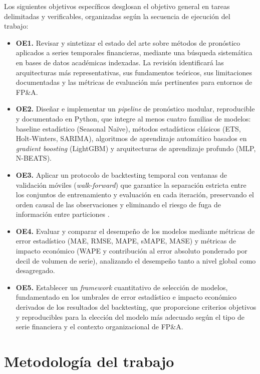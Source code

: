 Los siguientes objetivos específicos desglosan el objetivo general en tareas delimitadas y verificables, organizadas según la secuencia de ejecución del trabajo:

\begin{itemize}
  \item \textbf{OE1.} Revisar y sintetizar el estado del arte sobre métodos de pronóstico aplicados a series temporales financieras, mediante una búsqueda sistemática en bases de datos académicas indexadas. La revisión identificará las arquitecturas más representativas, sus fundamentos teóricos, sus limitaciones documentadas y las métricas de evaluación más pertinentes para entornos de FP\&A.

  \item \textbf{OE2.} Diseñar e implementar un \textit{pipeline} de pronóstico modular, reproducible y documentado en Python, que integre al menos cuatro familias de modelos: baseline estadístico (Seasonal Naïve), métodos estadísticos clásicos (ETS, Holt-Winters, SARIMA), algoritmos de aprendizaje automático basados en \textit{gradient boosting} (LightGBM) y arquitecturas de aprendizaje profundo (MLP, N-BEATS).

  \item \textbf{OE3.} Aplicar un protocolo de backtesting temporal con ventanas de validación móviles (\textit{walk-forward}) que garantice la separación estricta entre los conjuntos de entrenamiento y evaluación en cada iteración, preservando el orden causal de las observaciones y eliminando el riesgo de fuga de información entre particiones \parencite{Bergmeir2012}.

  \item \textbf{OE4.} Evaluar y comparar el desempeño de los modelos mediante métricas de error estadístico (MAE, RMSE, MAPE, sMAPE, MASE) y métricas de impacto económico (WAPE y contribución al error absoluto ponderado por decil de volumen de serie), analizando el desempeño tanto a nivel global como desagregado.

  \item \textbf{OE5.} Establecer un \textit{framework} cuantitativo de selección de modelos, fundamentado en los umbrales de error estadístico e impacto económico derivados de los resultados del backtesting, que proporcione criterios objetivos y reproducibles para la elección del modelo más adecuado según el tipo de serie financiera y el contexto organizacional de FP\&A.
\end{itemize}

\section{Metodología del trabajo}
\label{sec:metodologia}

